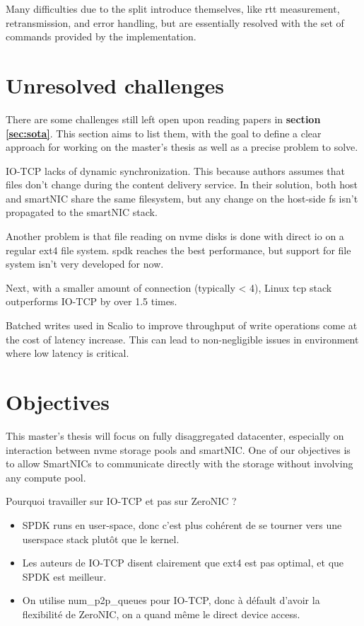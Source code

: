 Many difficulties due to the split introduce themselves, like \acrfull{rtt} measurement, retransmission, and error handling, but are
essentially resolved with the set of commands provided by the implementation.

\section{Unresolved challenges}

There are some challenges still left open upon reading papers in \textbf{section \ref{sec:sota}}. This section aims to
list them, with the goal to define a clear approach for working on the master's thesis as well as a precise problem to solve.

IO-TCP \cite{kim_rearchitecting_2023} lacks of dynamic synchronization. This because authors assumes that files don't change
during the content delivery service. In their solution, both host and smartNIC share the same filesystem, but any change
on the host-side \acrfull{fs} isn't propagated to the smartNIC stack.



Another problem is that file reading on \acrshort{nvme} disks is done with direct \acrshort{io} on a regular ext4 file system. \acrshort{spdk} reaches the best
performance, but support for file system isn't very developed for now.

Next, with a smaller amount of connection (typically < 4), Linux \acrshort{tcp} stack outperforms IO-TCP by over 1.5 times.

Batched writes used in Scalio \cite{sun_scalio_2025} to improve throughput of write operations come at the cost of latency
increase. This can lead to non-negligible issues in environment where low latency is critical.

\section{Objectives}

This master's thesis will focus on fully disaggregated datacenter, especially on interaction between \acrshort{nvme} storage pools and smartNIC.
One of our objectives is to allow SmartNICs to communicate directly with the storage without involving any compute pool.

\begin{draftbox}
	Pourquoi travailler sur IO-TCP et pas sur ZeroNIC ? 
	\begin{itemize}
		\item SPDK runs en user-space, donc c'est plus cohérent de se tourner vers une userspace stack plutôt que le kernel.
		\item Les auteurs de IO-TCP disent clairement que ext4 est pas optimal, et que SPDK est meilleur. 
		\item On utilise num\_p2p\_queues pour IO-TCP, donc à défault d'avoir la flexibilité de ZeroNIC, on a quand même le direct device access.
	\end{itemize}
\end{draftbox}


